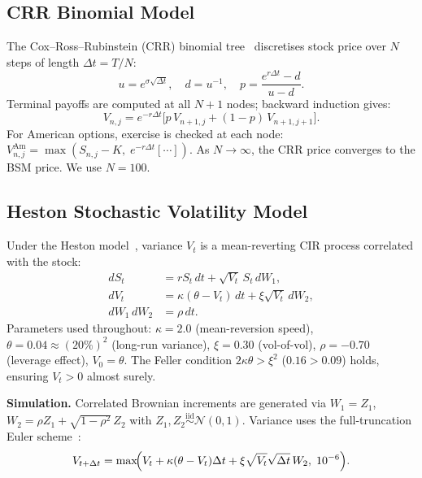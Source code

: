 \documentclass[12pt,a4paper]{article}
\begin{document}
\subsection{CRR Binomial Model}

The Cox--Ross--Rubinstein (CRR) binomial tree~\citep{CRR1979} discretises
stock price over $N$ steps of length $\Delta t = T/N$:
\begin{equation}
  u = e^{\sigma\sqrt{\Delta t}},
  \quad d = u^{-1},
  \quad p = \frac{e^{r\Delta t}-d}{u-d}.
  \label{eq:crr}
\end{equation}
Terminal payoffs are computed at all $N+1$ nodes; backward induction gives:
\begin{equation}
  V_{n,j} = e^{-r\Delta t}\bigl[p\,V_{n+1,j} + (1-p)\,V_{n+1,j+1}\bigr].
  \label{eq:crr_backward}
\end{equation}
For American options, exercise is checked at each node:
$V_{n,j}^{\mathrm{Am}} = \max(S_{n,j}-K,\; e^{-r\Delta t}[\cdots])$.
As $N\to\infty$, the CRR price converges to the BSM price.  We use $N=100$.

\subsection{Heston Stochastic Volatility Model}

Under the Heston model~\citep{Heston1993}, variance $V_t$ is a
mean-reverting CIR process correlated with the stock:
\begin{align}
  dS_t &= rS_t\,dt + \sqrt{V_t}\,S_t\,dW_1,
  \label{eq:heston_S}\\
  dV_t &= \kappa(\theta-V_t)\,dt + \xi\sqrt{V_t}\,dW_2,
  \label{eq:heston_V}\\
  dW_1\,dW_2 &= \rho\,dt.
  \label{eq:heston_corr}
\end{align}
Parameters used throughout: $\kappa=2.0$ (mean-reversion speed),
$\theta=0.04\approx(20\%)^2$ (long-run variance), $\xi=0.30$ (vol-of-vol),
$\rho=-0.70$ (leverage effect), $V_0=\theta$.
The Feller condition $2\kappa\theta > \xi^2$ ($0.16 > 0.09$) holds, ensuring
$V_t > 0$ almost surely.

\textbf{Simulation.}  Correlated Brownian increments are generated via
$W_1 = Z_1$, $W_2 = \rho Z_1 + \sqrt{1-\rho^2}\,Z_2$ with
$Z_1,Z_2\overset{\mathrm{iid}}{\sim}\mathcal{N}(0,1)$.
Variance uses the full-truncation Euler scheme~\citep{Andersen2008}:
\begin{equation}
  V_{t+\Delta t} = \max\!\Bigl(
    V_t + \kappa(\theta-V_t)\Delta t + \xi\sqrt{V_t}\sqrt{\Delta t}\,W_2,
    \;10^{-6}\Bigr).
  \label{eq:heston_euler}
\end{equation}
\end{document}
